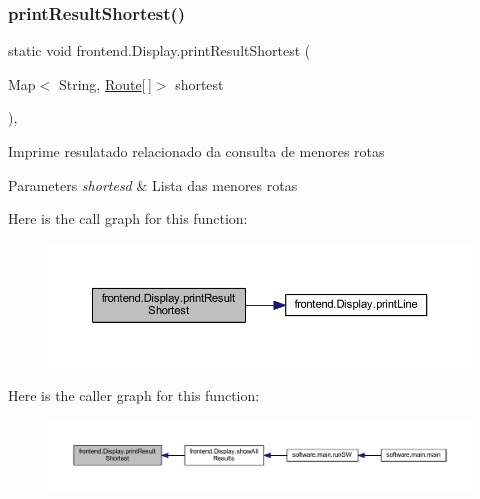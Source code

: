 \subsubsection{\texorpdfstring{print\+Result\+Shortest()}{printResultShortest()}}
{\footnotesize\ttfamily static void frontend.\+Display.\+print\+Result\+Shortest (\begin{DoxyParamCaption}\item[{Map$<$ String, \hyperlink{classdomain_1_1_route}{Route}\mbox{[}$\,$\mbox{]}$>$}]{shortest }\end{DoxyParamCaption})\hspace{0.3cm}{\ttfamily [static]}, {\ttfamily [private]}}

Imprime resulatado relacionado da consulta de menores rotas


\begin{DoxyParams}{Parameters}
{\em shortesd} & Lista das menores rotas \\
\hline
\end{DoxyParams}
Here is the call graph for this function\+:\nopagebreak
\begin{figure}[H]
\begin{center}
\leavevmode
\includegraphics[width=350pt]{classfrontend_1_1_display_ab2cef6740e59b37091b0215cf82a12f8_cgraph}
\end{center}
\end{figure}
Here is the caller graph for this function\+:\nopagebreak
\begin{figure}[H]
\begin{center}
\leavevmode
\includegraphics[width=350pt]{classfrontend_1_1_display_ab2cef6740e59b37091b0215cf82a12f8_icgraph}
\end{center}
\end{figure}
\mbox{\label{classfrontend_1_1_display_a80dcb9108b718e006f2f97f287619236}} 
